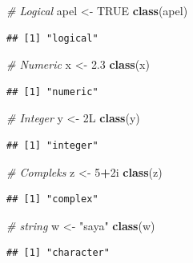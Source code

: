 \documentclass[]{book}
\newenvironment{Shaded}{\begin{snugshade}}{\end{snugshade}}
\newcommand{\CommentTok}[1]{\textcolor[rgb]{0.56,0.35,0.01}{\textit{#1}}}
\newcommand{\DecValTok}[1]{\textcolor[rgb]{0.00,0.00,0.81}{#1}}
\newcommand{\FloatTok}[1]{\textcolor[rgb]{0.00,0.00,0.81}{#1}}
\newcommand{\KeywordTok}[1]{\textcolor[rgb]{0.13,0.29,0.53}{\textbf{#1}}}
\newcommand{\NormalTok}[1]{#1}
\newcommand{\OperatorTok}[1]{\textcolor[rgb]{0.81,0.36,0.00}{\textbf{#1}}}
\newcommand{\OtherTok}[1]{\textcolor[rgb]{0.56,0.35,0.01}{#1}}
\newcommand{\StringTok}[1]{\textcolor[rgb]{0.31,0.60,0.02}{#1}}
\theoremstyle{definition}
\theoremstyle{definition}
\theoremstyle{definition}
\theoremstyle{remark}
\begin{document}
\begin{Shaded}
\begin{Highlighting}[]
\CommentTok{# Logical}
\NormalTok{apel <-}\StringTok{ }\OtherTok{TRUE}
\KeywordTok{class}\NormalTok{(apel)}
\end{Highlighting}
\end{Shaded}

\begin{verbatim}
## [1] "logical"
\end{verbatim}

\begin{Shaded}
\begin{Highlighting}[]
\CommentTok{# Numeric}
\NormalTok{x <-}\StringTok{ }\FloatTok{2.3}
\KeywordTok{class}\NormalTok{(x)}
\end{Highlighting}
\end{Shaded}

\begin{verbatim}
## [1] "numeric"
\end{verbatim}

\begin{Shaded}
\begin{Highlighting}[]
\CommentTok{# Integer}
\NormalTok{y <-}\StringTok{ }\NormalTok{2L}
\KeywordTok{class}\NormalTok{(y)}
\end{Highlighting}
\end{Shaded}

\begin{verbatim}
## [1] "integer"
\end{verbatim}

\begin{Shaded}
\begin{Highlighting}[]
\CommentTok{# Compleks}
\NormalTok{z <-}\StringTok{ }\DecValTok{5}\OperatorTok{+}\NormalTok{2i}
\KeywordTok{class}\NormalTok{(z)}
\end{Highlighting}
\end{Shaded}

\begin{verbatim}
## [1] "complex"
\end{verbatim}

\begin{Shaded}
\begin{Highlighting}[]
\CommentTok{# string}
\NormalTok{w <-}\StringTok{ "saya"}
\KeywordTok{class}\NormalTok{(w)}
\end{Highlighting}
\end{Shaded}

\begin{verbatim}
## [1] "character"
\end{verbatim}
\end{document}

